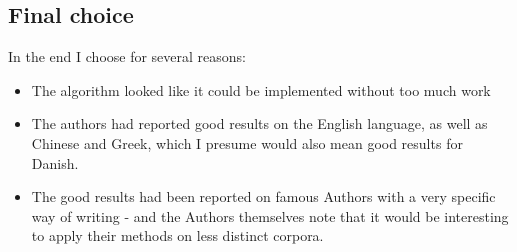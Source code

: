 \subsection{Final choice}

In the end I choose \cite{nr4} for several reasons:
\begin{itemize}
\item The algorithm looked like it could be implemented without too much work
\item The authors had reported good results on the English language, as well as Chinese and Greek, which I presume would also mean good results for Danish.
\item The good results had been reported on famous Authors with a very specific way of writing - and the Authors themselves note that it would be interesting to apply their methods on less distinct corpora. 
\end{itemize}
